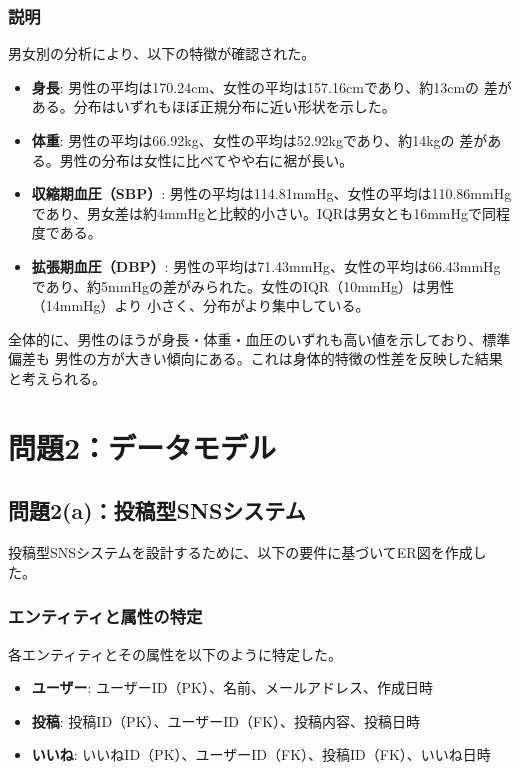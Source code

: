 \documentclass[12pt,a4paper]{ltjsarticle}
\begin{document}
\subsubsection*{説明}
男女別の分析により、以下の特徴が確認された。

\begin{itemize}[nosep]
    \item \textbf{身長}: 男性の平均は170.24cm、女性の平均は157.16cmであり、約13cmの
          差がある。分布はいずれもほぼ正規分布に近い形状を示した。
    \item \textbf{体重}: 男性の平均は66.92kg、女性の平均は52.92kgであり、約14kgの
          差がある。男性の分布は女性に比べてやや右に裾が長い。
    \item \textbf{収縮期血圧（SBP）}: 男性の平均は114.81mmHg、女性の平均は110.86mmHg
          であり、男女差は約4mmHgと比較的小さい。IQRは男女とも16mmHgで同程度である。
    \item \textbf{拡張期血圧（DBP）}: 男性の平均は71.43mmHg、女性の平均は66.43mmHg
          であり、約5mmHgの差がみられた。女性のIQR（10mmHg）は男性（14mmHg）より
          小さく、分布がより集中している。
\end{itemize}

全体的に、男性のほうが身長・体重・血圧のいずれも高い値を示しており、標準偏差も
男性の方が大きい傾向にある。これは身体的特徴の性差を反映した結果と考えられる。

\clearpage

\section{問題2：データモデル}\label{sec:problem2}

\subsection{問題2(a)：投稿型SNSシステム}\label{sec:er-diagram}

投稿型SNSシステムを設計するために、以下の要件に基づいてER図を作成した。

\subsubsection{エンティティと属性の特定}
各エンティティとその属性を以下のように特定した。

\begin{itemize}[nosep]
    \item \textbf{ユーザー}: ユーザーID（PK）、名前、メールアドレス、作成日時
    \item \textbf{投稿}: 投稿ID（PK）、ユーザーID（FK）、投稿内容、投稿日時
    \item \textbf{いいね}: いいねID（PK）、ユーザーID（FK）、投稿ID（FK）、いいね日時
\end{itemize}
\end{document}
